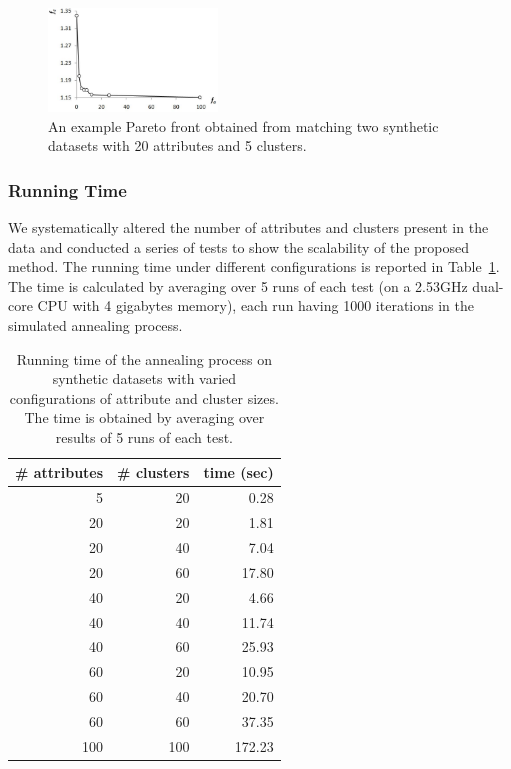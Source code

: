 \begin{figure}[tb]
\begin{center}
\includegraphics[width=0.4\textwidth]{fig/syn_pareto.eps}
\end{center}
\caption[An example Pareto front result from the synthetic dataset]{\label{fig:syn_pareto} An example Pareto front obtained from matching two synthetic datasets with 20 attributes and 5 clusters.}
\end{figure}

\subsubsection{Running Time}
We systematically altered the number of attributes and clusters present in the data and conducted a series of tests to show the scalability of the proposed method. The running time under different configurations is reported in Table~\ref{tbl:scale}. The time is calculated by averaging over 5 runs of each test (on a 2.53GHz dual-core CPU with 4 gigabytes memory), each run having 1000 iterations in the simulated annealing process. 

\begin{table}[tbh]
\begin{center}
\begin{tabular}{r|r|r}
\hline
\# attributes & \# clusters & time (sec)\\
\hline
5   &   20  &   0.28\\
20  &   20  &   1.81\\
20  &   40  &   7.04\\
20  &   60  &   17.80\\
40  &   20  &   4.66\\
40  &   40  &   11.74\\
40  &   60  &   25.93\\
60  &   20  &   10.95\\
60  &   40  &   20.70\\
60  &   60  &   37.35\\
100 &   100 &   172.23\\
\hline
\end{tabular}
\end{center}
\caption[Running time on the synthetic dataset]{\label{tbl:scale} Running time of the annealing process on synthetic datasets with varied configurations of attribute and cluster sizes. The time is obtained by averaging over results of 5 runs of each test.}
\end{table}



